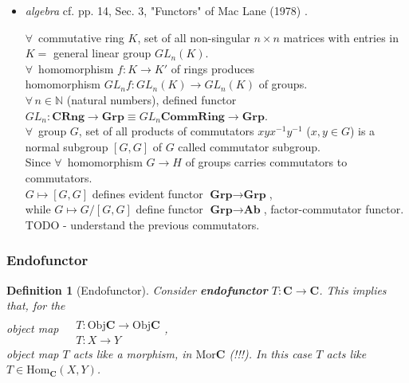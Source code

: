 \documentclass[10pt]{amsart}
\newtheorem{definition}{Definition}
\begin{document}
\begin{multicols*}{2}
\begin{itemize}
\item \emph{algebra} cf. pp. 14, Sec. 3, "Functors" of Mac Lane (1978) \cite{MacL1978}.

$\forall \, $ commutative ring $K$, set of all non-singular $n\times n$ matrices with entries in $K = $ general linear group $GL_n(K)$. \\
$\forall \, $ homomorphism $f: K \to K'$ of rings produces \\
homomorphism $GL_n f : GL_n(K) \to GL_n(K)$ of groups.  \\

$\forall \, n \in \mathbb{N}$ (natural numbers), defined functor $GL_n: \textbf{CRng} \to \textbf{Grp} \equiv GL_n \textbf{CommRing} \to \textbf{Grp}$.  \\


$\forall \, $ group $G$, set of all products of commutators $xyx^{-1} y^{-1}$ ($x,y \in G$) is a normal subgroup $[G, G]$ of $G$ called commutator subgroup. \\

Since $\forall \, $ homomorphism $G \to H$ of groups carries commutators to commutators.  \\
$G \mapsto [G, G]$ defines evident functor $\textbf{Grp} \to \textbf{Grp}$, \\
while $G \mapsto G/[G, G]$ define functor $\textbf{Grp} \to \textbf{Ab}$, factor-commutator functor. \\
TODO - understand the previous commutators.

\end{itemize} 

\subsubsection{Endofunctor}

\begin{definition}[Endofunctor]\label{Def:Endofunctor}
Consider \textbf{endofunctor} $T : \mathbf{C} \to \mathbf{C}$. This implies that, for the \\

object map $\begin{aligned} & \quad \\ 
	& T : \text{Obj}{\mathbf{C}} \to \text{Obj}{\mathbf{C}} \\ 
	& T : X \to Y \end{aligned}$, \\
	
	object map $T$ acts like a morphism, in $\text{Mor}\mathbf{C}$ (!!!). In this case $T$ acts like $T\in \text{Hom}_{\mathbf{C}}(X, Y)$.  \\
	

\end{definition}
\end{multicols*}
\end{document}
